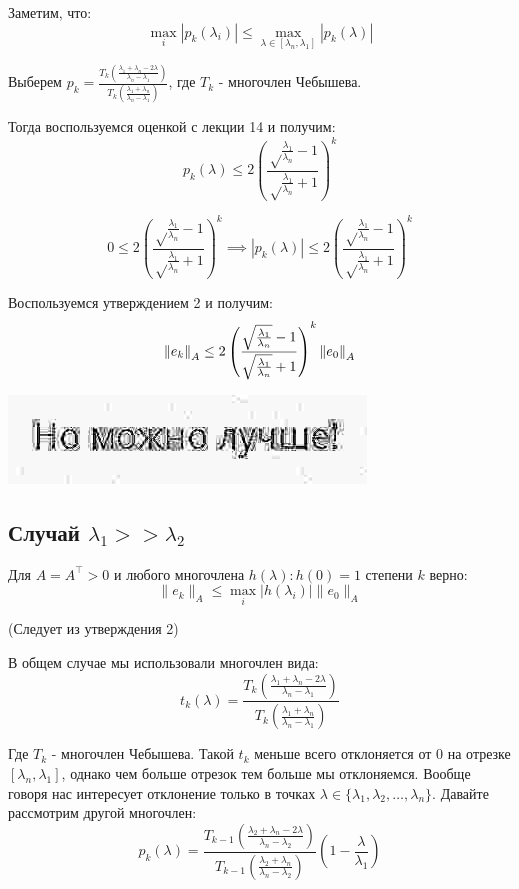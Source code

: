 Заметим, что:
$$\max_i |p_k(\lambda_i)| \le \max_{\lambda \in [\lambda_n, \lambda_1]} |p_k(\lambda)|$$

Выберем $p_k = \frac{T_k\left(\frac{\lambda_1 + \lambda_n - 2 \lambda}{\lambda_n-\lambda_1}\right)}{T_k\left(\frac{\lambda_1 + \lambda_n}{\lambda_n-\lambda_1}\right)}$, где $T_k$ - многочлен Чебышева.

Тогда воспользуемся оценкой с лекции 14 и получим:
$$p_k(\lambda) \le  2\left(\frac{\sqrt\frac{\lambda_1}{\lambda_n} - 1}{\sqrt\frac{\lambda_1}{\lambda_n} + 1}\right)^{k}$$

$$0 \le 2\left(\frac{\sqrt\frac{\lambda_1}{\lambda_n} - 1}{\sqrt\frac{\lambda_1}{\lambda_n} + 1}\right)^{k} \implies |p_k(\lambda)| \le 2\left(\frac{\sqrt\frac{\lambda_1}{\lambda_n} - 1}{\sqrt\frac{\lambda_1}{\lambda_n} + 1}\right)^{k}$$

Воспользуемся утверждением 2 и получим:
$$\norm[A]{e_k} \le 2\left(\frac{\sqrt\frac{\lambda_1}{\lambda_n} - 1}{\sqrt\frac{\lambda_1}{\lambda_n} + 1}\right)^{k}\norm[A]{e_0}$$

\begin{center}
	\includegraphics[scale=0.3]{img/q5_2} \\
\end{center}

\subsection{Случай $\lambda_1 >> \lambda_2$}

\begin{proposal}
	Для $A = A^\top > 0$ и любого многочлена $h(\lambda): h(0) = 1$ степени $k$ верно:
	$$\|e_k\|_A \le \max_i |h(\lambda_i)|\|e_0\|_A$$
\end{proposal}
\begin{center}
	(Следует из утверждения 2)
\end{center}

В общем случае мы использовали многочлен вида:
$$t_k(\lambda) = \frac{T_k\left(\frac{\lambda_1 + \lambda_n - 2 \lambda}{\lambda_n-\lambda_1}\right)}{T_k\left(\frac{\lambda_1 + \lambda_n}{\lambda_n-\lambda_1}\right)}$$

Где $T_k$ - многочлен Чебышева. Такой $t_k$ меньше всего отклоняется от 0 на отрезке $[\lambda_n, \lambda_1]$, однако чем больше отрезок тем больше мы отклоняемся. Вообще говоря нас интересует отклонение только в точках $\lambda \in \{\lambda_1, \lambda_2, \dots, \lambda_n\}$. Давайте рассмотрим другой многочлен:
$$p_k(\lambda) = \frac{T_{k-1}\left(\frac{\lambda_2 + \lambda_n - 2 \lambda}{\lambda_n-\lambda_2}\right)}{T_{k-1}\left(\frac{\lambda_2 + \lambda_n}{\lambda_n-\lambda_2}\right)}\left(1-\frac{\lambda}{\lambda_1}\right)$$


